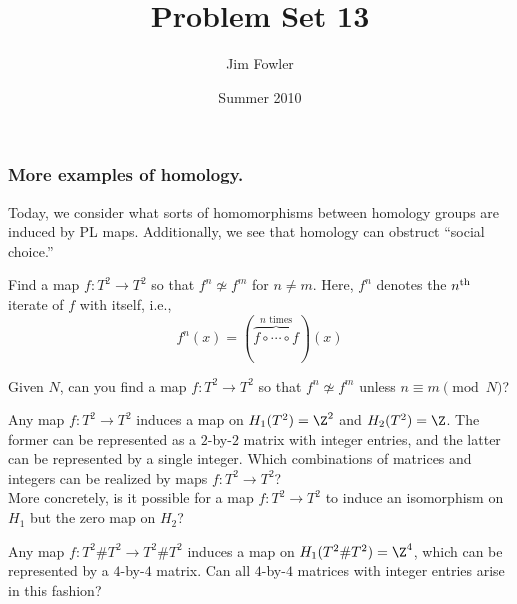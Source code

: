 \documentclass[12pt]{pset}
\title{Problem Set 13}
\author{Jim Fowler}
\date{Summer 2010}
\begin{document}
\maketitle


\subsubsection*{More examples of homology.}  Today, we consider what
sorts of homomorphisms between homology groups are induced by PL maps.
Additionally, we see that homology can obstruct ``social choice.''



\begin{requiredproblem}
  Find a map $f : T^2 \to T^2$ so that $f^n \not\simeq f^m$ for $n \neq m$.  Here, $f^n$ denotes the $n^{\mbox{\scriptsize th}}$ iterate of $f$ with itself, i.e.,
$$f^n(x) = (\overbrace{f \circ \cdots \circ f}^{\mbox{$n$ times}})(x)$$
\end{requiredproblem}

\begin{problem}
  Given $N$, can you find a map $f : T^2 \to T^2$ so that $f^n \not\simeq f^m$ unless $n \equiv m \pmod N$?
\end{problem}

\begin{problem}
  Any map $f : T^2 \to T^2$ induces a map on $H_1(T^2) = \Z^2$ and
  $H_2(T^2) = \Z$.  The former can be represented as a $2$-by-$2$
  matrix with integer entries, and the latter can be represented by a
  single integer.  Which combinations of matrices and integers can be
  realized by maps $f : T^2 \to T^2$? \vspace{1ex} \\
  More concretely, is it possible for a map $f : T^2 \to T^2$ to induce an isomorphism on $H_1$ but the zero map on $H_2$? 

\end{problem}

\begin{problem}
  Any map $f : T^2 \# T^2 \to T^2 \# T^2$ induces a map on $H_1(T^2 \# T^2) = \Z^4$, which can be represented by a $4$-by-$4$ matrix.  Can all $4$-by-$4$ matrices with integer entries arise in this fashion?
\end{problem}
\end{document}
